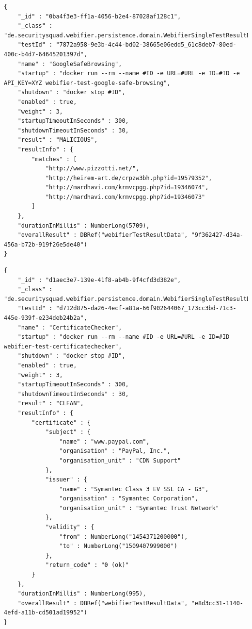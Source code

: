 \newpage

\begin{scriptsize}
\begin{lstlisting}
{
    "_id" : "0ba4f3e3-ff1a-4056-b2e4-87028af128c1",
    "_class" : "de.securitysquad.webifier.persistence.domain.WebifierSingleTestResultData",
    "testId" : "7872a958-9e3b-4c44-bd02-38665e06edd5_61c8deb7-80ed-400c-b4d7-64645201397d",
    "name" : "GoogleSafeBrowsing",
    "startup" : "docker run --rm --name #ID -e URL=#URL -e ID=#ID -e API_KEY=XYZ webifier-test-google-safe-browsing",
    "shutdown" : "docker stop #ID",
    "enabled" : true,
    "weight" : 3,
    "startupTimeoutInSeconds" : 300,
    "shutdownTimeoutInSeconds" : 30,
    "result" : "MALICIOUS",
    "resultInfo" : {
        "matches" : [
            "http://www.pizzotti.net/",
            "http://heirem-art.de/crpzw3bh.php?id=19579352",
            "http://mardhavi.com/krmvcpgg.php?id=19346074",
            "http://mardhavi.com/krmvcpgg.php?id=19346073"
        ]
    },
    "durationInMillis" : NumberLong(5709),
    "overallResult" : DBRef("webifierTestResultData", "9f362427-d34a-456a-b72b-919f26e5de40")
}
\end{lstlisting}
\end{scriptsize}

\newpage

\begin{scriptsize}
\begin{lstlisting}
{
    "_id" : "d1aec3e7-139e-41f8-ab4b-9f4cfd3d382e",
    "_class" : "de.securitysquad.webifier.persistence.domain.WebifierSingleTestResultData",
    "testId" : "d712d875-da26-4ecf-a81a-66f902644067_173cc3bd-71c3-445e-939f-e234deb24b2a",
    "name" : "CertificateChecker",
    "startup" : "docker run --rm --name #ID -e URL=#URL -e ID=#ID webifier-test-certificatechecker",
    "shutdown" : "docker stop #ID",
    "enabled" : true,
    "weight" : 3,
    "startupTimeoutInSeconds" : 300,
    "shutdownTimeoutInSeconds" : 30,
    "result" : "CLEAN",
    "resultInfo" : {
        "certificate" : {
            "subject" : {
                "name" : "www.paypal.com",
                "organisation" : "PayPal, Inc.",
                "organisation_unit" : "CDN Support"
            },
            "issuer" : {
                "name" : "Symantec Class 3 EV SSL CA - G3",
                "organisation" : "Symantec Corporation",
                "organisation_unit" : "Symantec Trust Network"
            },
            "validity" : {
                "from" : NumberLong("1454371200000"),
                "to" : NumberLong("1509407999000")
            },
            "return_code" : "0 (ok)"
        }
    },
    "durationInMillis" : NumberLong(995),
    "overallResult" : DBRef("webifierTestResultData", "e8d3cc31-1140-4efd-a11b-cd501ad19952")
}
\end{lstlisting}
\end{scriptsize}


